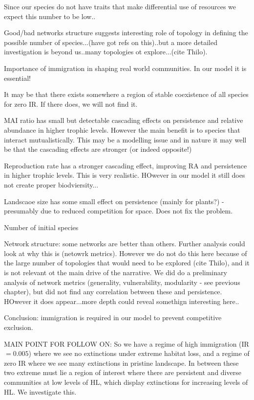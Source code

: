 Since our species do not have traits that make differential use of resources we expect this number to be low..

Good/bad networks structure suggests interesting role of topology in defining the possible number of species...(have got refs on this)..but a more detailed investigation is beyond us..many topologies ot explore...(cite Thilo).

Importance of immigration in shaping real world communities. In our model it is essential!

It may be that there exists somewhere a region of stable coexistence of all species for zero IR. If there does, we will not find it. 


MAI ratio has small but detectable cascading effects on persistence and relative abundance in higher trophic levels. However the main benefit is to species that interact mutualistically. This may be a modelling issue and in nature it may well be that the cascading effects are stronger (or indeed opposite!)

Reproduction rate has a stronger cascading effect, improving RA and persistence in higher trophic levels. This is very realistic. HOwever in our model it still does not create proper biodviersity...

Landscaoe size has some small effect on persistence (mainly for plants?) - presumably due to reduced competition for space. Does not fix the problem.

Number of initial species 

Network structure: some networks are better than others. Further analysis could look at why this is (netowrk metrics). However we do not do this here because of the large number of topologies that would need to be explored (cite Thilo), and it is not relevant ot the main drive of the narrative. We did do a preliminary analysis of network metrics (generality, vulnerability, modularity - see previous chapter), but did not find any correlation between these and persistence. HOwever it does appear...more depth could reveal somethign interesting here..

Conclusion: immigration is required in our model to prevent competitive exclusion.  

MAIN POINT FOR FOLLOW ON: So we have a regime of high immigration (IR$=0.005$) where we see no extinctions under extreme habitat loss, and a regime of zero IR where we see many extinctions in pristine landscape. In between these two extreme must lie a region of interest where there are persistent and diverse communities at low levels of HL, which display extinctions for increasing levels of HL. We investigate this.


